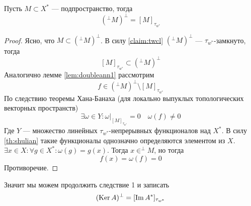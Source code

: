 \begin{lemma}\label{lem:annul}
	Пусть $M \subset X^*$ --- подпространство, тогда 
	$$
	({}^\perp M)^\perp = [M]_{\tau_{w^*}}
	$$
\end{lemma}
\begin{proof}
	Ясно, что $M \subset ({}^\perp M)^\perp$. В силу \ref{claim:twcl} $({}^\perp M)^\perp$ --- $\tau_{w^*}$-замкнуто, тогда 
	$$
	[M]_{\tau_{w^*}} \subset ({}^\perp M)^\perp
	$$
	Аналогично лемме \ref{lem:doubleann1} рассмотрим
	$$
	f \in ({}^\perp M)^\perp \setminus [M]_{\tau_{w^*}}
	$$
	По следствию теоремы Хана-Банаха (для локально выпуклых топологических векторных пространств)
	$$
	\exists \omega \in Y\colon \omega\big|_{[M]_{\tau_{w^*}}} = 0 \quad \omega(f) \neq 0 
	$$
	Где $Y$ --- множество линейных $\tau_{w^*}$-непрерывных функционалов над $X^*$. В силу \ref{th:shulian} такие функционалы однозначно определяются элементом из $X$. $\exists x \in X\colon \forall g \in X^*\colon \omega(g) = g(x)$. Тогда $x \in ^\perp M$, но тогда 
	$$
	f(x) = \omega(f) = 0
	$$
	Противоречие.
\end{proof}
Значит мы можем продолжить следствие 1 и записать 
$$
(\operatorname{Ker} A)^\perp = [\operatorname{Im} A^*]_{\tau_{w^*}}
$$

